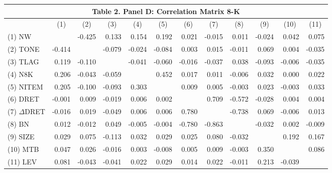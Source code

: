 \begin{table}[H] \label{T2PD}
  \centering
    \begin{tabular}{lrrrrrrrrrrr}
    \multicolumn{12}{c}{\textbf{Table 2. Panel D: Correlation Matrix 8-K}} \\
    \midrule
    \midrule
      & \multicolumn{1}{c}{(1)} & \multicolumn{1}{c}{(2)} & \multicolumn{1}{c}{(3)} & \multicolumn{1}{c}{(4)} & \multicolumn{1}{c}{(5)} & \multicolumn{1}{c}{(6)} & \multicolumn{1}{c}{(7)} & \multicolumn{1}{c}{(8)} & \multicolumn{1}{c}{(9)} & \multicolumn{1}{c}{(10)} & \multicolumn{1}{c}{(11)} \\
    \midrule
    (1) NW & & -0.425 & 0.133 & 0.154 & 0.192 & 0.021 & -0.015 & 0.011 & -0.024 & 0.042 & 0.075 \\
    (2) TONE & -0.414 & & -0.079 & -0.024 & -0.084 & 0.003 & 0.015 & -0.011 & 0.069 & 0.004 & -0.035 \\
    (3) TLAG & 0.119 & -0.110 & & -0.041 & -0.060 & -0.016 & -0.037 & 0.038 & -0.093 & -0.006 & -0.035 \\
    (4) N8K & 0.206 & -0.043 & -0.059 & & 0.452 & 0.017 & 0.011 & -0.006 & 0.032 & 0.000 & 0.022 \\
    (5) NITEM & 0.205 & -0.100 & -0.093 & 0.303 & & 0.009 & 0.005 & -0.003 & 0.023 & -0.003 & 0.033 \\
    (6) DRET & -0.001 & 0.009 & -0.019 & 0.006 & 0.002 & & 0.709 & -0.572 & -0.028 & 0.004 & 0.004 \\
    (7) $\Delta$DRET & -0.016 & 0.019 & -0.049 & 0.006 & 0.006 & 0.780 & & -0.738 & 0.069 & -0.006 & 0.013 \\
    (8) BN & 0.012 & -0.012 & 0.049 & -0.005 & -0.004 & -0.780 & -0.863 & & -0.032 & 0.002 & -0.009 \\
    (9) SIZE & 0.029 & 0.075 & -0.113 & 0.032 & 0.029 & 0.025 & 0.080 & -0.032 & & 0.192 & 0.167 \\
    (10) MTB & 0.047 & 0.026 & -0.016 & 0.003 & -0.008 & 0.005 & 0.009 & -0.003 & 0.350 & & 0.086 \\
    (11) LEV & 0.081 & -0.043 & -0.041 & 0.022 & 0.029 & 0.014 & 0.022 & -0.011 & 0.213 & -0.039 & \\
    \bottomrule
    \bottomrule
    \end{tabular}%
  \label{tab:addlabel}%
\end{table}%
